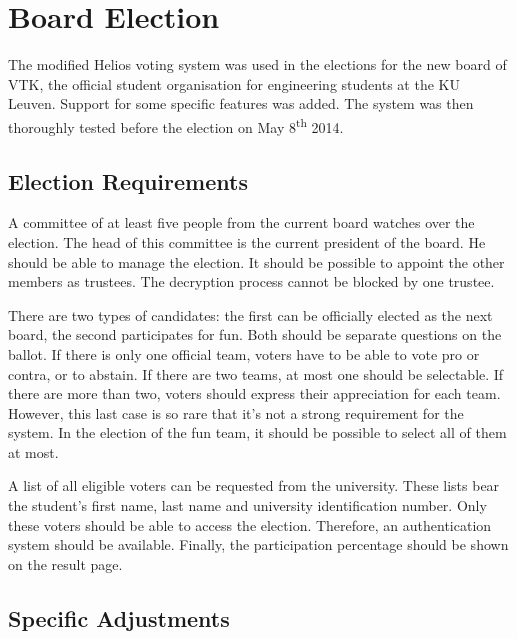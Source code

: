 % 
%

\section{Board Election}
\label{sec:board_election}

The modified Helios voting system was used in the elections for the new board of VTK, the official student organisation for engineering students at the KU Leuven. Support for some specific features was added. The system was then thoroughly tested before the election on May 8\textsuperscript{th} 2014.

\subsection{Election Requirements}


A committee of at least five people from the current board watches over the election. The head of this committee is the current president of the board. He should be able to manage the election. It should be possible to appoint the other members as trustees. The decryption process cannot be blocked by one trustee.


\par There are two types of candidates: the first can be officially elected as the next board, the second participates for fun. Both should be separate questions on the ballot. If there is only one official team, voters have to be able to vote pro or contra, or to abstain. If there are two teams, at most one should be selectable. If there are more than two, voters should express their appreciation for each team. However, this last case is so rare that it's not a strong requirement for the system. In the election of the fun team, it should be possible to select all of them at most.

\par A list of all eligible voters can be requested from the university. These lists bear the student's first name, last name and university identification number. Only these voters should be able to access the election. Therefore, an authentication system should be available. Finally, the participation percentage should be shown on the result page.

\subsection{Specific Adjustments}


